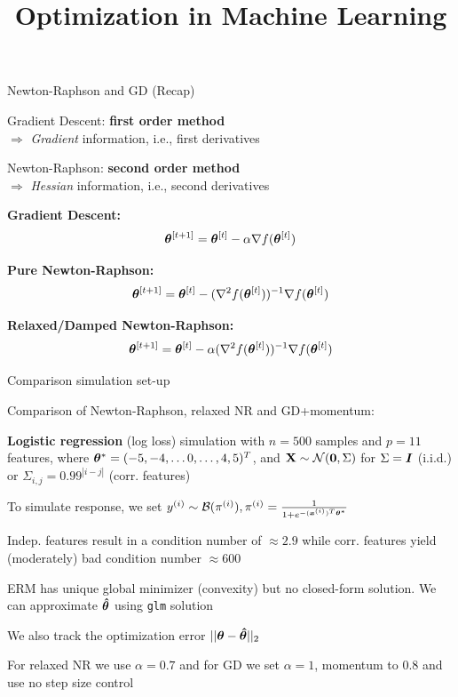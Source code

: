 \documentclass[11pt,compress,t,notes=noshow, xcolor=table]{beamer}
\title{Optimization in Machine Learning}
\begin{document}

\begin{framei}{Newton-Raphson and GD (Recap)}
\item Gradient Descent: \textbf{first order method} \\
$\Rightarrow$ \textit{Gradient} information, i.e., first derivatives
\item Newton-Raphson: \textbf{second order method} \\
$\Rightarrow$ \textit{Hessian} information, i.e., second derivatives
\vfill
\item[] \textbf{Gradient Descent:}
$$
\bm{\theta}^{[t +1]} = \bm{\theta}^{[t]} - \alpha \nabla f(\bm{\theta}^{[t]})
$$
\item[] \textbf{Pure Newton-Raphson:}
$$
\bm{\theta}^{[t +1]} = \bm{\theta}^{[t]} - (\nabla^2 f(\bm{\theta}^{[t]}))^{-1}\nabla f(\bm{\theta}^{[t]})
$$
\item[] \textbf{Relaxed/Damped Newton-Raphson:}
$$
\bm{\theta}^{[t +1]} = \bm{\theta}^{[t]} -\alpha (\nabla^2 f(\bm{\theta}^{[t]}))^{-1}\nabla f(\bm{\theta}^{[t]})
$$
\end{framei}


\begin{framei}{Comparison simulation set-up}
\item Comparison of Newton-Raphson, relaxed NR and GD+momentum:
\item \textbf{Logistic regression} (log loss) simulation with $n=500$ samples and $p=11$ features, where $\bm{\theta}^{\ast}=(-5,-4,\ldots0,\ldots,4,5)^T$, and $\mathbf{X} \sim \mathcal{N}(\mathbf{0}, \Sigma)$ for $\Sigma=\bm{I}$ (i.i.d.) or $\Sigma_{i,j}=0.99^{|i-j|}$ (corr. features)
\item To simulate response, we set $y^{(i)} \sim \mathcal{B}(\pi^{(i)}), \pi^{(i)} = \frac{1}{1+e^{-(\bm{x}^{(i)})^T\bm{\theta}^{\ast}}}$
\item Indep. features result in a condition number of $\approx 2.9$ while corr. features yield (moderately) bad condition number $\approx 600$
\item ERM has unique global minimizer (convexity) but no closed-form solution. We can approximate $\bm{\hat\theta}$ using \texttt{glm} solution
\item We also track the optimization error $|| \bm{\theta} - \bm{\hat\theta} ||_2$
\item For relaxed NR we use $\alpha=0.7$ and for GD we set $\alpha=1$, momentum to $0.8$ and use no step size control
\end{framei}
\end{document}
